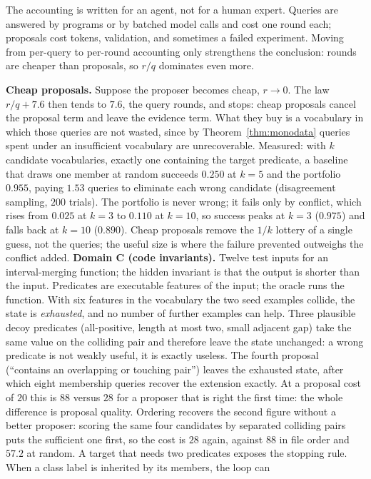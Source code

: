 \documentclass[11pt]{article}
\begin{document}
The accounting is written for an agent, not for a human expert. Queries are answered by programs
or by batched model calls and cost one round each; proposals cost tokens, validation, and sometimes
a failed experiment. Moving from per-query to per-round accounting only strengthens the conclusion:
rounds are cheaper than proposals, so $r/q$ dominates even more.

\textbf{Cheap proposals.} Suppose the proposer becomes cheap, $r \to 0$. The law $r/q + 7.6$ then tends
to $7.6$, the query rounds, and stops: cheap proposals cancel the proposal term and leave the evidence
term. What they buy is a vocabulary in which those queries are not wasted, since by
Theorem~\ref{thm:monodata} queries spent under an insufficient vocabulary are unrecoverable. Measured:
with $k$ candidate vocabularies, exactly one containing the target predicate, a baseline that draws one
member at random succeeds $0.250$ at $k=5$ and the portfolio $0.955$, paying $1.53$ queries to eliminate
each wrong candidate (disagreement sampling, $200$ trials). The portfolio is never wrong; it fails only
by conflict, which rises from $0.025$ at $k=3$ to $0.110$ at $k=10$, so success peaks at $k=3$ ($0.975$)
and falls back at $k=10$ ($0.890$). Cheap proposals remove the $1/k$ lottery of a single guess, not the
queries; the useful size is where the failure prevented outweighs the conflict added.
\textbf{Domain C (code invariants).} Twelve test inputs for an interval-merging function; the hidden
invariant is that the output is shorter than the input. Predicates are executable features of the
input; the oracle runs the function. With six features in the vocabulary the two seed examples
collide, the state is \emph{exhausted}, and no number of further examples can help. Three
plausible decoy predicates (all-positive, length at most two, small adjacent gap) take the same
value on the colliding pair and therefore leave the state unchanged: a wrong predicate is not
weakly useful, it is exactly useless. The fourth proposal (``contains an overlapping or touching
pair'') leaves the exhausted state, after which eight membership queries recover the extension
exactly. At a proposal cost of $20$ this is $88$ versus $28$ for a proposer that is right the first
time: the whole difference is proposal quality. Ordering recovers the second figure without a better
proposer: scoring the same four candidates by separated colliding pairs puts the sufficient one first,
so the cost is $28$ again, against $88$ in file order and $57.2$ at random. A target that needs two
predicates exposes the stopping rule. When a class label is inherited by its members, the loop can
\end{document}

